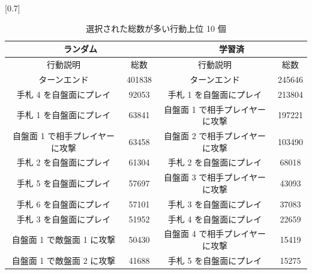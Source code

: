 \documentclass[12pt]{jarticle}
\begin{document}
  \begin{table}[t]
    \centering
    \caption{選択された総数が多い行動上位 10 個}
    \vspace{-0.3cm}
    \label{table:actioncount}
    \scalebox{0.7}[0.7]{
      \begin{tabular}{|cc|cc|}
        \hline
        \multicolumn{2}{|c|}{ランダム}      & \multicolumn{2}{c|}{学習済}       \\ \hline
        \multicolumn{1}{|c|}{行動説明} & 総数 & \multicolumn{1}{c|}{行動説明} & 総数 \\ \hline \hline
        \multicolumn{1}{|c|}{ターンエンド}    & 401838  & \multicolumn{1}{c|}{ターンエンド}    & 245646  \\ \hline
        \multicolumn{1}{|c|}{手札 4 を自盤面にプレイ}    &  92053  & \multicolumn{1}{c|}{手札 1 を自盤面にプレイ}    & 213804  \\ \hline
        \multicolumn{1}{|c|}{手札 1 を自盤面にプレイ}    & 63841  & \multicolumn{1}{c|}{自盤面 1 で相手プレイヤーに攻撃}    & 197221  \\ \hline
        \multicolumn{1}{|c|}{自盤面 1 で相手プレイヤーに攻撃}    & 63458  & \multicolumn{1}{c|}{自盤面 2 で相手プレイヤーに攻撃}    & 103490  \\ \hline
        \multicolumn{1}{|c|}{手札 2 を自盤面にプレイ}    & 61304  & \multicolumn{1}{c|}{手札 2 を自盤面にプレイ}    & 68018  \\ \hline
        \multicolumn{1}{|c|}{手札 5 を自盤面にプレイ}    & 57697  & \multicolumn{1}{c|}{自盤面 3 で相手プレイヤーに攻撃}    & 43093  \\ \hline
        \multicolumn{1}{|c|}{手札 6 を自盤面にプレイ}    & 57101  & \multicolumn{1}{c|}{手札 3 を自盤面にプレイ}    & 37083  \\ \hline
        \multicolumn{1}{|c|}{手札 3 を自盤面にプレイ}    & 51952  & \multicolumn{1}{c|}{手札 4 を自盤面にプレイ}    & 22659  \\ \hline
        \multicolumn{1}{|c|}{自盤面 1 で敵盤面 1 に攻撃}    & 50430  & \multicolumn{1}{c|}{自盤面 4 で相手プレイヤーに攻撃}    & 15419  \\ \hline
     
        \multicolumn{1}{|c|}{自盤面 1 で敵盤面 2 に攻撃}    & 41688  & \multicolumn{1}{c|}{手札 5 を自盤面にプレイ}    & 15275  \\ \hline
        \end{tabular}
    }
  \end{table}
\end{document}
